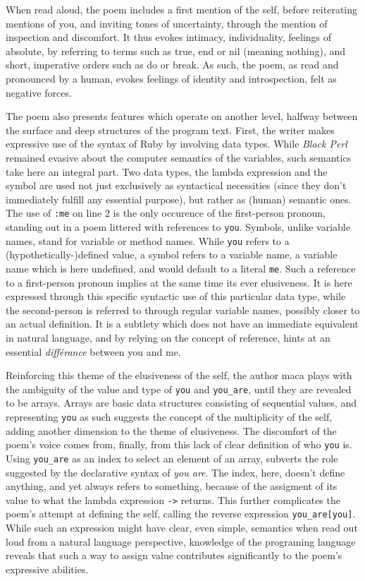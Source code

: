 When read aloud, the poem includes a first mention of the self, before reiterating mentions of you, and inviting tones of uncertainty, through the mention of inspection and discomfort. It thus evokes intimacy, individuality, feelings of absolute, by referring to terms such as true, end or nil (meaning nothing), and short, imperative orders such as do or break. As such, the poem, as read and pronounced by a human, evokes feelings of identity and introspection, felt as negative forces.

The poem also presents features which operate on another level, halfway between the surface and deep structures of the program text. First, the writer makes expressive use of the syntax of Ruby by involving data types. While \emph{Black Perl} remained evasive about the computer semantics of the variables, such semantics take here an integral part. Two data types, the lambda expression and the symbol are used not just exclusively as syntactical necessities (since they don't immediately fulfill any essential purpose), but rather as (human) semantic ones. The use of \lstinline{:me} on line 2 is the only occurence of the first-person pronoun, standing out in a poem littered with references to \lstinline{you}. Symbols, unlike variable names, stand for variable or method names. While \lstinline{you} refers to a (hypothetically-)defined value, a symbol refers to a variable name, a variable name which is here undefined, and would default to a literal \lstinline{me}. Such a reference to a first-person pronoun implies at the same time its ever elusiveness. It is here expressed through this specific syntactic use of this particular data type, while the second-person is referred to through regular variable names, possibly closer to an actual definition. It is a subtlety which does not have an immediate equivalent in natural language, and by relying on the concept of reference, hints at an essential \emph{différance} between you and me.

Reinforcing this theme of the elusiveness of the self, the author maca plays with the ambiguity of the value and type of \lstinline{you} and \lstinline{you_are}, until they are revealed to be arrays. Arrays are basic data structures consisting of sequential values, and representing \lstinline{you} as such suggests the concept of the multiplicity of the self, adding another dimension to the theme of elusiveness. The discomfort of the poem's voice comes from, finally, from this lack of clear definition of who \lstinline{you} is. Using \lstinline{you_are} as an index to select an element of an array, subverts the role suggested by the declarative syntax of \emph{you are}. The index, here, doesn't define anything, and yet always refers to something, because of the assigment of its value to what the lambda expression \lstinline{->} returns. This further complicates the poem's attempt at defining the self, calling the reverse expression \lstinline{you_are[you]}. While such an expression might have clear, even simple, semantics when read out loud from a natural language perspective, knowledge of the programing language reveals that such a way to assign value contributes significantly to the poem's expressive abilities.

